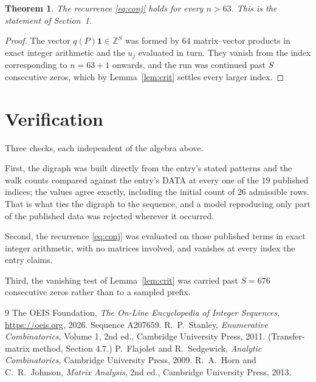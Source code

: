 \documentclass[11pt,a4paper]{article}
\theoremstyle{plain}
\newtheorem{theorem}{Theorem}
\theoremstyle{definition}
\begin{document}
\begin{theorem}
The recurrence \eqref{eq:conj} holds for every $n>63$. This is the statement of
Section~1.
\end{theorem}

\begin{proof}
The vector $q(P)\mathbf{1}\in\mathbb{Z}^{S}$ was formed by $64$ matrix--vector
products in exact integer arithmetic and the $u_j$ evaluated in turn. They vanish from the
index corresponding to $n=63+1$ onwards, and the run was continued past $S$ consecutive
zeros, which by Lemma~\ref{lem:crit} settles every larger index.
\end{proof}

\section{Verification}

Three checks, each independent of the algebra above.

First, the digraph was built directly from the entry's stated patterns and the walk counts
compared against the entry's DATA at every one of the $19$ published indices; the
values agree exactly, including the initial count of $26$ admissible rows. That is
what ties the digraph to the sequence, and a model reproducing only part of the published
data was rejected wherever it occurred.

Second, the recurrence \eqref{eq:conj} was evaluated on those published terms in exact
integer arithmetic, with no matrices involved, and vanishes at every index the entry claims.

Third, the vanishing test of Lemma~\ref{lem:crit} was carried past $S=676$ consecutive
zeros rather than to a sampled prefix.

\begin{thebibliography}{9}
 The OEIS Foundation, \emph{The On-Line Encyclopedia of Integer
Sequences}, \url{https://oeis.org}, 2026. Sequence A207659.
 R.~P.~Stanley, \emph{Enumerative Combinatorics}, Volume 1, 2nd ed.,
Cambridge University Press, 2011. (Transfer-matrix method, Section 4.7.)
 P.~Flajolet and R.~Sedgewick, \emph{Analytic Combinatorics}, Cambridge
University Press, 2009.
 R.~A.~Horn and C.~R.~Johnson, \emph{Matrix Analysis}, 2nd ed., Cambridge
University Press, 2013.
\end{thebibliography}
\end{document}
